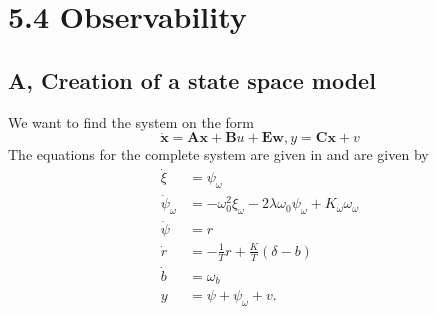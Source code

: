 \section{5.4 Observability}
\subsection{A, Creation of a state space model}
\label{seq:54a}
We want to find the system on the form $$\mathbf{\Dot{x}} = \mathbf{Ax} + \mathbf{B}u + \mathbf{Ew},  y = \mathbf{Cx} + v$$
The equations for the complete system are given in \cite{assignment} and are given by
\begin{subequations}
\begin{align}
    \dot{\xi} &= \psi_\omega\\
    \dot{\psi}_\omega &= -\omega^2_0 \xi_\omega - 2 \lambda \omega_0 \psi_\omega + K_\omega \omega_\omega\\
    \dot{\psi} &= r\\ 
    \dot{r} &= -\frac{1}{T} r + \frac{K}{T} (\delta-b)\\ 
    \dot{b} &= \omega_b\\
    y &= \psi + \psi_\omega + v.
\end{align}
\end{subequations}


